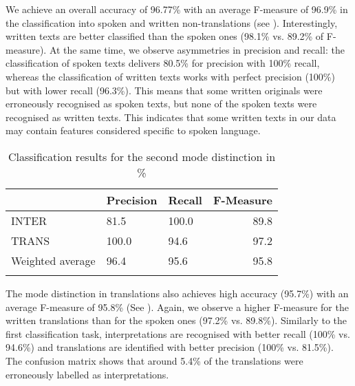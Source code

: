 \documentclass[output=paper,colorlinks,citecolor=brown]{langscibook}
\begin{document}
We achieve an overall accuracy of 96.77\% with an average F-measure of 96.9\% in the classification into spoken and written non-translations (see ). Interestingly, written texts are better classified than the spoken ones (98.1\% vs. 89.2\% of F-measure). At the same time, we observe asymmetries in precision and recall: the classification of spoken texts delivers 80.5\% for precision with 100\% recall, whereas the classification of written texts works with perfect precision (100\%) but with lower recall (96.3\%). This means that some written originals were erroneously recognised as spoken texts, but none of the spoken texts were recognised as written texts. This indicates that some written texts in our data may contain features considered specific to  spoken language.

\begin{table}[b]
    \begin{tabularx}{\textwidth}{XYYr}
\lsptoprule
 &\bf Precision & \bf Recall & \bf F-Measure\\
\midrule
INTER&    81.5  &   100.0 & 89.8     \\
TRANS &   100.0 &   94.6  & 97.2      \\
Weighted average &  96.4 & 95.6  & 95.8 \\
\lspbottomrule
    \end{tabularx}
    \caption{Classification results for the second mode distinction in \%}
    \label{tab:rq2-2}
\end{table}

The mode distinction in translations also achieves high accuracy (95.7\%) with an average F-measure of 95.8\% (See ). %
Again, we observe a higher F-measure for the written translations than for the spoken ones (97.2\% vs. 89.8\%). Similarly to the first classification task, interpretations are recognised with better recall (100\% vs. 94.6\%) and translations are identified with better precision (100\% vs. 81.5\%). The confusion matrix shows that around 5.4\% of the translations were erroneously labelled as interpretations.

 
\end{document}
